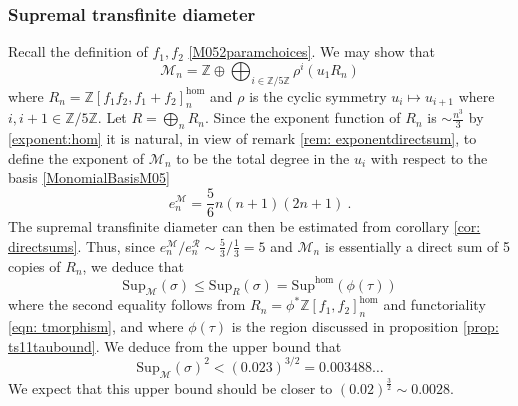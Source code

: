 \documentclass[a4paper,10pt]{amsart}
\theoremstyle{definition}
\theoremstyle{remark}
\numberwithin{equation}{section}
\newcommand{\Z}{\mathbb Z}
\newcommand{\ts}{\mathrm{Sup}}
\newcommand{\0}{\color{blue}{\mathsf{0}}}
\begin{document}
\subsubsection{Supremal transfinite diameter} Recall the definition of $f_1,f_2$  \eqref{M052paramchoices}.
We may show that 
\begin{equation}  \mathcal{M}_n =  \Z \oplus \bigoplus_{i \in \Z/5\Z}  \rho^i \left(  u_1  R_n\right) \end{equation}
where $R_n= \Z[f_1f_2 , f_1+f_2]^{\hom}_n$ and $\rho$ is the cyclic symmetry $u_i \mapsto u_{i+1}$ where $i,i+1 \in \Z/5\Z$.   Let $R= \bigoplus_n R_n$.
Since the exponent function of $R_n$ is $\sim \frac{n^3}{3} $ by  \eqref{exponent:hom}  it is natural, in view of remark \ref{rem: exponentdirectsum}, to define the exponent of $\mathcal{M}_n$ to be  the total degree in the $u_i$ with respect to the basis \eqref{MonomialBasisM05}
\begin{equation}  e^{\mathcal{M}}_n =   \frac{5}{6} n(n+1)(2n+1) \ . \end{equation} 
The supremal transfinite diameter can then be estimated from corollary \ref{cor: directsums}. Thus, since 
$e_n^{\mathcal{M}}/e_n^{\mathcal{R}} \sim \frac{5}{3}/\frac{1}{3}= 5$ and $\mathcal{M}_n$ is essentially a direct sum of 5 copies of $R_n$,  we deduce that 
\[  \ts_{\mathcal{M}} (\sigma) \leq  \ts_{R} ( \sigma)=  \ts^{\hom} ( \phi(\tau))\]
where the second equality follows from  $R_n = \phi^*  \Z[f_1, f_2]^{\hom}_n$ and functoriality \eqref{eqn: tmorphism}, and
where $\phi(\tau)$ is the region discussed in proposition \ref{prop: ts11taubound}. We deduce from the upper bound that 
\begin{equation} \label{UBfortsofm05}  \ts_{\mathcal{M}} (\sigma)^2 < (0.023)^{3/2}= 0.003488\ldots  \end{equation} 
We expect that  this upper bound should be closer to $(0.02)^{\frac{3}{2}} \sim 0.0028$. 
\end{document}
